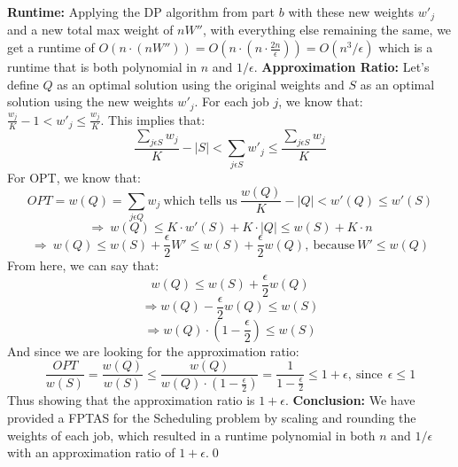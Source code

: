 \documentclass[oneside]{homework} %
\begin{document}
\textbf{Runtime:} 
\newline
Applying the DP algorithm from part $b$ with these new weights $w'_j$ and a new total max weight of $nW''$, with everything else remaining the same, we get a runtime of $O(n\cdot(nW'')) = O(n\cdot(n\cdot\frac{2n}{\epsilon})) = O(n^3/\epsilon)$ which is a runtime that is both polynomial in $n$ and $1/\epsilon$.
\newline
\newline
\textbf{Approximation Ratio:} 
\newline
Let's define $Q$ as an optimal solution using the original weights and $S$ as an optimal solution using the new weights $w'_j$.
\newline
For each job $j$, we know that: $\frac{w_j}{K} - 1 < w'_j \leq \frac{w_j}{K}$. This implies that: 
$$\frac{\sum\limits_{j\epsilon S}w_j}{K} - |S| < \sum\limits_{j\epsilon S}w'_j \leq \frac{\sum\limits_{j\epsilon S}w_j}{K}$$
For OPT, we know that: 
$$OPT = w(Q) = \sum\limits_{j\epsilon Q}w_j \ \text{which tells us} \ \frac{w(Q)}{K} - |Q| < w'(Q) \leq w'(S)$$ 
$$\Longrightarrow \ w(Q) \leq K \cdot w'(S) + K \cdot |Q| \leq w(S) + K \cdot n$$
$$\Longrightarrow \ w(Q) \leq w(S) + \frac{\epsilon}{2}W' \leq w(S) + \frac{\epsilon}{2}w(Q), \ \text{because} \ W' \leq w(Q)$$
From here, we can say that:
$$w(Q) \leq w(S) + \frac{\epsilon}{2}w(Q)$$
$$\Longrightarrow w(Q) - \frac{\epsilon}{2}w(Q) \leq w(S)$$
$$\Longrightarrow w(Q) \cdot (1 - \frac{\epsilon}{2}) \leq w(S)$$
And since we are looking for the approximation ratio:
$$\frac{OPT}{w(S)} = \frac{w(Q)}{w(S)} \leq \frac{w(Q)}{w(Q) \cdot (1 - \frac{\epsilon}{2})} = \frac{1}{1 - \frac{\epsilon}{2}} \leq 1 + \epsilon, \ \text{since} \ \ \epsilon \leq 1$$
Thus showing that the approximation ratio is $1 + \epsilon$.
\newline
\newline
\textbf{Conclusion:} We have provided a FPTAS for the Scheduling problem by scaling and rounding the weights of each job, which resulted in a runtime polynomial in both $n$ and $1/\epsilon$ with an approximation ratio of $1 + \epsilon$.\hfill\qed
\end{document}
